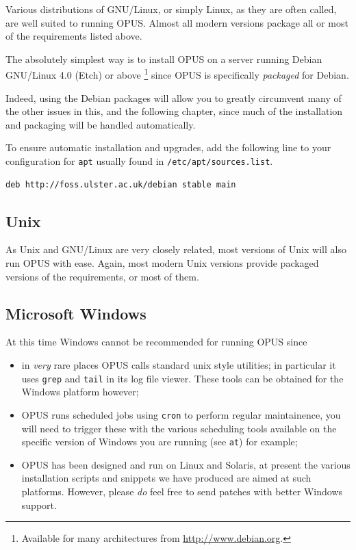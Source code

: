 \documentclass[12 pt]{book}
\begin{document}
Various distributions of GNU/Linux, or simply Linux, as they are often called, are well suited to running OPUS. Almost all modern versions
package all or most of the requirements listed above.

The absolutely simplest way is to install OPUS on a server running Debian GNU/Linux 4.0 (Etch) or above%
\footnote{Available for many architectures from \url{http://www.debian.org}.}%
since OPUS is specifically \emph{packaged} for Debian.

Indeed, using the Debian packages will allow you to greatly circumvent many of the other issues in this, and the following chapter, since
much of the installation and packaging will be handled automatically.

To ensure automatic installation and upgrades, add the following line to your configuration for \lstinline!apt! usually found in
\lstinline!/etc/apt/sources.list!.

\begin{lstlisting}
deb http://foss.ulster.ac.uk/debian stable main
\end{lstlisting}

\subsection{Unix}

As Unix and GNU/Linux are very closely related, most versions of Unix will also run OPUS with ease. Again, most modern Unix versions
provide packaged versions of the requirements, or most of them.

\subsection{Microsoft Windows}

At this time Windows cannot be recommended for running OPUS since
\begin{itemize}
  \item in \emph{very} rare places OPUS calls standard unix style utilities; in particular it uses \texttt{grep} and \texttt{tail} in its log
    file viewer. These tools can be obtained for the Windows platform however;
  \item OPUS runs scheduled jobs using \texttt{cron} to perform regular maintainence, you will need to trigger these with the various
    scheduling tools available on the specific version of Windows you are running (see \texttt{at}) for example;
  \item OPUS has been designed and run on Linux and Solaris, at present the various installation scripts and snippets we have produced
    are aimed at such platforms. However, please \emph{do} feel free to send patches with better Windows support.
\end{itemize}
\end{document}

